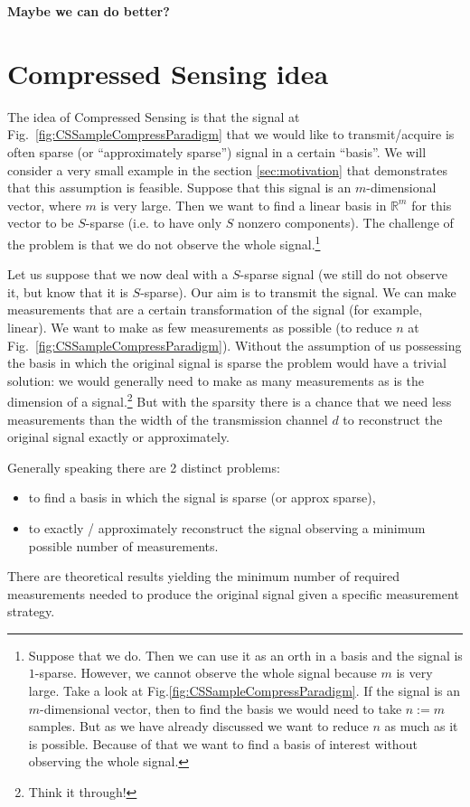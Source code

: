 \documentclass[11pt]{article}
\numberwithin{equation}{section}
\theoremstyle{definition}
\begin{document}
\begin{center}
    \bf \color{red} Maybe we can do better?
\end{center}

\section{Compressed Sensing idea}
The idea of Compressed Sensing is that the signal at Fig.~\ref{fig:CSSampleCompressParadigm} that we would like to transmit/acquire is often sparse (or ``approximately sparse'') signal in a certain ``basis''.
We will consider a very small example in the section \ref{sec:motivation} that demonstrates that this assumption is feasible.
Suppose that this signal is an $m$-dimensional vector, where $m$ is very large.
Then we want to find a linear basis in $\mathbb R^m$ for this vector to be $S$-sparse (i.e. to have only $S$ nonzero components).
The challenge of the problem is that we do not observe the whole signal.\footnote{
    Suppose that we do.
    Then we can use it as an orth in a basis and the signal is $1$-sparse.
    However, we cannot observe the whole signal because $m$ is very large.
    Take a look at Fig.\ref{fig:CSSampleCompressParadigm}.
    If the signal is an $m$-dimensional vector, then to find the basis we would need to take $n := m$ samples.
    But as we have already discussed we want to reduce $n$ as much as it is possible.
    Because of that we want to find a basis of interest without observing the whole signal.
}

Let us suppose that we now deal with a $S$-sparse signal (we still do not observe it, but know that it is $S$-sparse).
Our aim is to transmit the signal.
We can make measurements that are a certain transformation of the signal (for example, linear).
We want to make as few measurements as possible (to reduce $n$ at Fig.~\ref{fig:CSSampleCompressParadigm}).
Without the assumption of us possessing the basis in which the original signal is sparse the problem would have a trivial solution:
we would generally need to make as many measurements as is the dimension of a signal.\footnote{Think it through!}
But with the sparsity there is a chance that we need less measurements than the width of the transmission channel $d$
to reconstruct the original signal exactly or approximately.

Generally speaking there are 2 distinct problems:
\begin{itemize}
    \item to find a basis in which the signal is sparse (or approx sparse),
    \item to exactly / approximately reconstruct the signal observing a minimum possible number of measurements.
\end{itemize}
There are theoretical results yielding the minimum number of required measurements needed to produce the original signal given a specific measurement strategy.
\end{document}
